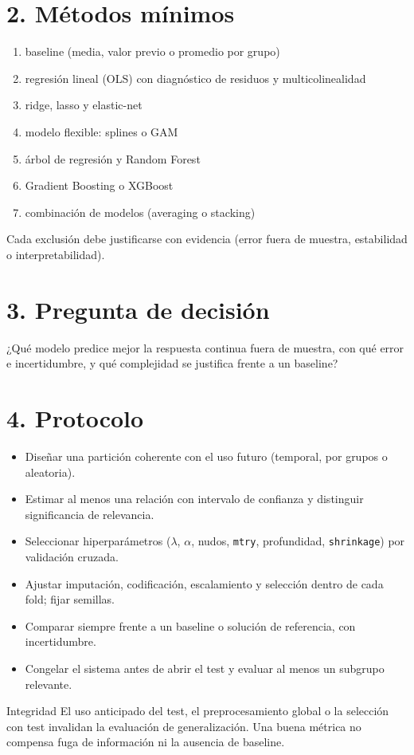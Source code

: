 \documentclass[11pt,letterpaper]{article}
\begin{document}
\section*{2. Métodos mínimos}
\begin{enumerate}
\item baseline (media, valor previo o promedio por grupo)
\item regresión lineal (OLS) con diagnóstico de residuos y multicolinealidad
\item ridge, lasso y elastic-net
\item modelo flexible: splines o GAM
\item árbol de regresión y Random Forest
\item Gradient Boosting o XGBoost
\item combinación de modelos (averaging o stacking)
\end{enumerate}
Cada exclusión debe justificarse con evidencia (error fuera de muestra, estabilidad o interpretabilidad).

\section*{3. Pregunta de decisión}
¿Qué modelo predice mejor la respuesta continua fuera de muestra, con qué error e incertidumbre, y qué
complejidad se justifica frente a un baseline?

\section*{4. Protocolo}
\begin{itemize}
\item Diseñar una partición coherente con el uso futuro (temporal, por grupos o aleatoria).
\item Estimar al menos una relación con intervalo de confianza y distinguir significancia de relevancia.
\item Seleccionar hiperparámetros ($\lambda$, $\alpha$, nudos, \texttt{mtry}, profundidad, \texttt{shrinkage}) por validación cruzada.
\item Ajustar imputación, codificación, escalamiento y selección dentro de cada fold; fijar semillas.
\item Comparar siempre frente a un baseline o solución de referencia, con incertidumbre.
\item Congelar el sistema antes de abrir el test y evaluar al menos un subgrupo relevante.
\end{itemize}
\begin{alertbox}{Integridad}
El uso anticipado del test, el preprocesamiento global o la selección con test invalidan la evaluación de generalización. Una buena métrica no compensa fuga de información ni la ausencia de baseline.
\end{alertbox}
\end{document}
